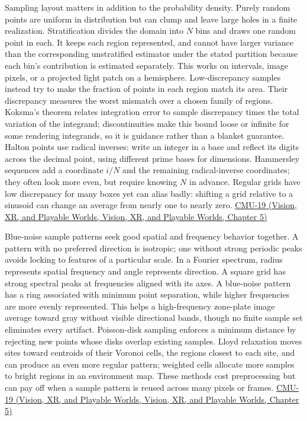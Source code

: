 Sampling layout matters in addition to the probability density. Purely random points are uniform in distribution but can clump and leave large holes in a finite realization. Stratification divides the domain into \(N\) bins and draws one random point in each. It keeps each region represented, and cannot have larger variance than the corresponding unstratified estimator under the stated partition because each bin's contribution is estimated separately. This works on intervals, image pixels, or a projected light patch on a hemisphere. Low-discrepancy samples instead try to make the fraction of points in each region match its area. Their discrepancy measures the worst mismatch over a chosen family of regions. Koksma's theorem relates integration error to sample discrepancy times the total variation of the integrand; discontinuities make this bound loose or infinite for some rendering integrands, so it is guidance rather than a blanket guarantee. Halton points use radical inverses: write an integer in a base and reflect its digits across the decimal point, using different prime bases for dimensions. Hammersley sequences add a coordinate \(i/N\) and the remaining radical-inverse coordinates; they often look more even, but require knowing \(N\) in advance. Regular grids have low discrepancy for many boxes yet can alias badly: shifting a grid relative to a sinusoid can change an average from nearly one to nearly zero. \href{../07-Vision-XR-and-Playable-Worlds/main.pdf\#nameddest=04-visual-computing-ii-ch036-cmu-19---variance-reduction}{CMU-19 (Vision, XR, and Playable Worlds, Vision, XR, and Playable Worlds, Chapter 5)}

Blue-noise sample patterns seek good spatial and frequency behavior together. A pattern with no preferred direction is isotropic; one without strong periodic peaks avoids locking to features of a particular scale. In a Fourier spectrum, radius represents spatial frequency and angle represents direction. A square grid has strong spectral peaks at frequencies aligned with its axes. A blue-noise pattern has a ring associated with minimum point separation, while higher frequencies are more evenly represented. This helps a high-frequency zone-plate image average toward gray without visible directional bands, though no finite sample set eliminates every artifact. Poisson-disk sampling enforces a minimum distance by rejecting new points whose disks overlap existing samples. Lloyd relaxation moves sites toward centroids of their Voronoi cells, the regions closest to each site, and can produce an even more regular pattern; weighted cells allocate more samples to bright regions in an environment map. These methods cost preprocessing but can pay off when a sample pattern is reused across many pixels or frames. \href{../07-Vision-XR-and-Playable-Worlds/main.pdf\#nameddest=04-visual-computing-ii-ch036-cmu-19---variance-reduction}{CMU-19 (Vision, XR, and Playable Worlds, Vision, XR, and Playable Worlds, Chapter 5)}

